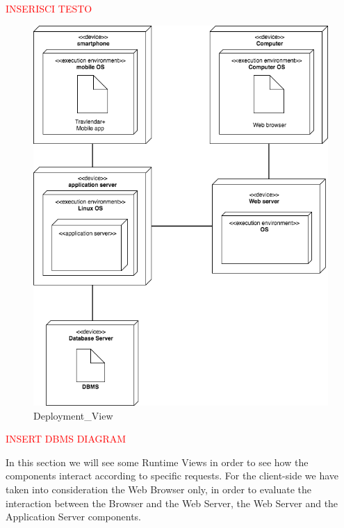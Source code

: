 \textcolor{red}{\Huge INSERISCI TESTO}
\begin{figure}[H]
	\centering
	\includegraphics[scale=0.17]{Images/Architecture/Deployment_View}
	\caption{Deployment\_View}
\end{figure}


\textcolor{red}{\Huge INSERT DBMS DIAGRAM}

In this section we will see some Runtime Views in order to see how the components interact according to specific requests.
For the client-side we have taken into consideration the Web Browser only, in order to evaluate the interaction between the Browser and the Web Server, the Web Server and the Application Server components.

